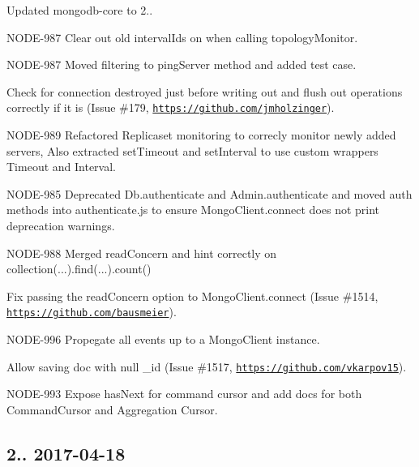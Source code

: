 \begin{DoxyItemize}
\item Updated mongodb-\/core to 2..
\begin{DoxyItemize}
\item N\+O\+D\+E-\/987 Clear out old interval\+Ids on when calling topology\+Monitor.
\item N\+O\+D\+E-\/987 Moved filtering to ping\+Server method and added test case.
\item Check for connection destroyed just before writing out and flush out operations correctly if it is (Issue \#179, \href{https://github.com/jmholzinger}{\tt https\+://github.\+com/jmholzinger}).
\item N\+O\+D\+E-\/989 Refactored Replicaset monitoring to correcly monitor newly added servers, Also extracted set\+Timeout and set\+Interval to use custom wrappers Timeout and Interval.
\end{DoxyItemize}
\item N\+O\+D\+E-\/985 Deprecated Db.\+authenticate and Admin.\+authenticate and moved auth methods into authenticate.\+js to ensure Mongo\+Client.\+connect does not print deprecation warnings.
\item N\+O\+D\+E-\/988 Merged read\+Concern and hint correctly on collection(...).find(...).count()
\item Fix passing the read\+Concern option to Mongo\+Client.\+connect (Issue \#1514, \href{https://github.com/bausmeier}{\tt https\+://github.\+com/bausmeier}).
\item N\+O\+D\+E-\/996 Propegate all events up to a Mongo\+Client instance.
\item Allow saving doc with null {\ttfamily \+\_\+id} (Issue \#1517, \href{https://github.com/vkarpov15}{\tt https\+://github.\+com/vkarpov15}).
\item N\+O\+D\+E-\/993 Expose has\+Next for command cursor and add docs for both Command\+Cursor and Aggregation Cursor.
\end{DoxyItemize}

\subsection*{2.. 2017-\/04-\/18 }


